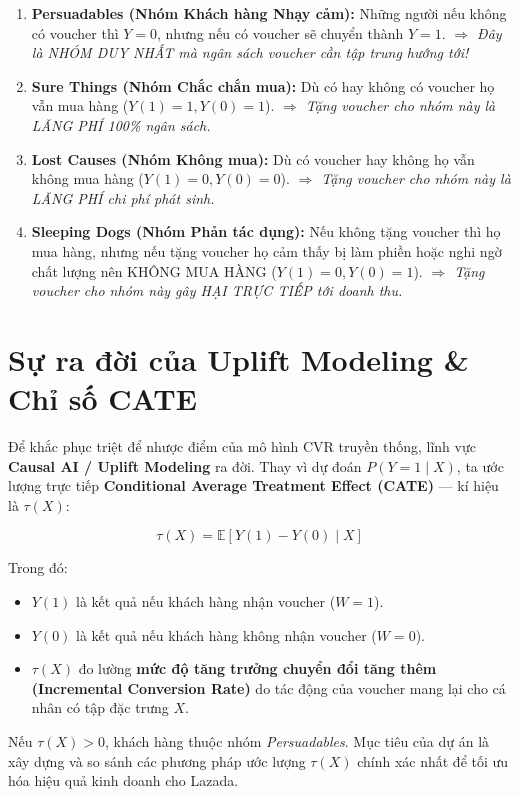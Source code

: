 \begin{enumerate}[leftmargin=*]
    \item \textbf{Persuadables (Nhóm Khách hàng Nhạy cảm):} 
    Những người nếu không có voucher thì $Y=0$, nhưng nếu có voucher sẽ chuyển thành $Y=1$. 
    \textit{$\Rightarrow$ Đây là NHÓM DUY NHẤT mà ngân sách voucher cần tập trung hướng tới!}

    \item \textbf{Sure Things (Nhóm Chắc chắn mua):} 
    Dù có hay không có voucher họ vẫn mua hàng ($Y(1)=1, Y(0)=1$). 
    \textit{$\Rightarrow$ Tặng voucher cho nhóm này là LÃNG PHÍ 100\% ngân sách.}

    \item \textbf{Lost Causes (Nhóm Không mua):} 
    Dù có voucher hay không họ vẫn không mua hàng ($Y(1)=0, Y(0)=0$). 
    \textit{$\Rightarrow$ Tặng voucher cho nhóm này là LÃNG PHÍ chi phí phát sinh.}

    \item \textbf{Sleeping Dogs (Nhóm Phản tác dụng):} 
    Nếu không tặng voucher thì họ mua hàng, nhưng nếu tặng voucher họ cảm thấy bị làm phiền hoặc nghi ngờ chất lượng nên KHÔNG MUA HÀNG ($Y(1)=0, Y(0)=1$). 
    \textit{$\Rightarrow$ Tặng voucher cho nhóm này gây HẠI TRỰC TIẾP tới doanh thu.}
\end{enumerate}

\section{Sự ra đời của Uplift Modeling \& Chỉ số CATE}

Để khắc phục triệt để nhược điểm của mô hình CVR truyền thống, lĩnh vực \textbf{Causal AI / Uplift Modeling} ra đời. Thay vì dự đoán $P(Y=1 \mid X)$, ta ước lượng trực tiếp \textbf{Conditional Average Treatment Effect (CATE)} — kí hiệu là $\tau(X)$:

\begin{equation}
    \tau(X) = \mathbb{E}[Y(1) - Y(0) \mid X]
\end{equation}

Trong đó:
\begin{itemize}
    \item $Y(1)$ là kết quả nếu khách hàng nhận voucher ($W=1$).
    \item $Y(0)$ là kết quả nếu khách hàng không nhận voucher ($W=0$).
    \item $\tau(X)$ đo lường \textbf{mức độ tăng trưởng chuyển đổi tăng thêm (Incremental Conversion Rate)} do tác động của voucher mang lại cho cá nhân có tập đặc trưng $X$.
\end{itemize}

Nếu $\tau(X) > 0$, khách hàng thuộc nhóm \textit{Persuadables}. Mục tiêu của dự án là xây dựng và so sánh các phương pháp ước lượng $\tau(X)$ chính xác nhất để tối ưu hóa hiệu quả kinh doanh cho Lazada.

